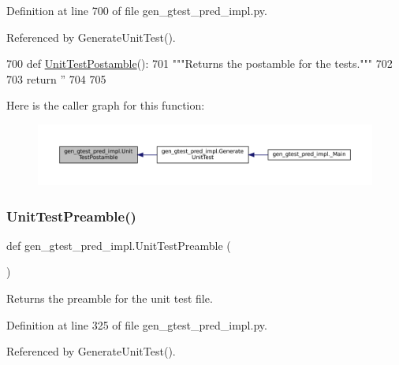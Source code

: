 Definition at line 700 of file gen\+\_\+gtest\+\_\+pred\+\_\+impl.\+py.



Referenced by Generate\+Unit\+Test().


\begin{DoxyCode}
700 \textcolor{keyword}{def }\hyperlink{namespacegen__gtest__pred__impl_a57b922f50d0807896496dcd883c1f098}{UnitTestPostamble}():
701   \textcolor{stringliteral}{"""Returns the postamble for the tests."""}
702 
703   \textcolor{keywordflow}{return} \textcolor{stringliteral}{''}
704 
705 
\end{DoxyCode}
Here is the caller graph for this function\+:
\nopagebreak
\begin{figure}[H]
\begin{center}
\leavevmode
\includegraphics[width=350pt]{namespacegen__gtest__pred__impl_a57b922f50d0807896496dcd883c1f098_icgraph}
\end{center}
\end{figure}
\mbox{\label{namespacegen__gtest__pred__impl_ae52dc86461d1b666c7b658a8c27c69f9}} 
\subsubsection{\texorpdfstring{Unit\+Test\+Preamble()}{UnitTestPreamble()}}
{\footnotesize\ttfamily def gen\+\_\+gtest\+\_\+pred\+\_\+impl.\+Unit\+Test\+Preamble (\begin{DoxyParamCaption}{ }\end{DoxyParamCaption})}

\begin{DoxyVerb}Returns the preamble for the unit test file.\end{DoxyVerb}
 

Definition at line 325 of file gen\+\_\+gtest\+\_\+pred\+\_\+impl.\+py.



Referenced by Generate\+Unit\+Test().


